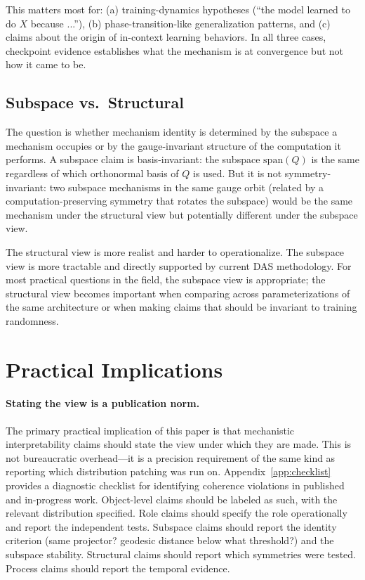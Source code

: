 \documentclass[11pt]{article}
\theoremstyle{remark}
\begin{document}
This matters most for: (a) training-dynamics hypotheses (``the model
learned to do $X$ because ...''), (b) phase-transition-like generalization
patterns, and (c) claims about the origin of in-context learning
behaviors.  In all three cases, checkpoint evidence establishes what
the mechanism is at convergence but not how it came to be.

\subsection{Subspace vs.\ Structural}

The question is whether mechanism identity is determined by the subspace
a mechanism occupies or by the gauge-invariant structure of the
computation it performs.  A subspace claim is basis-invariant: the
subspace $\mathrm{span}(Q)$ is the same regardless of which orthonormal
basis of $Q$ is used.  But it is not symmetry-invariant: two subspace
mechanisms in the same gauge orbit (related by a computation-preserving
symmetry that rotates the subspace) would be the same mechanism under
the structural view but potentially different under the subspace view.

The structural view is more realist and harder to operationalize.  The
subspace view is more tractable and directly supported by current DAS
methodology.  For most practical questions in the field, the subspace
view is appropriate; the structural view becomes important when
comparing across parameterizations of the same architecture or when
making claims that should be invariant to training randomness.


\section{Practical Implications}\label{sec:implications}

\paragraph{Stating the view is a publication norm.}
The primary practical implication of this paper is that mechanistic
interpretability claims should state the view under which they are made.
This is not bureaucratic overhead---it is a precision requirement of
the same kind as reporting which distribution patching was run on.
Appendix~\ref{app:checklist} provides a diagnostic checklist for
identifying coherence violations in published and in-progress work.
Object-level claims should be labeled as such, with the relevant
distribution specified.  Role claims should specify the role operationally
and report the independent tests.  Subspace claims should report the
identity criterion (same projector? geodesic distance below what
threshold?) and the subspace stability.  Structural claims should report
which symmetries were tested.  Process claims should report the
temporal evidence.
\end{document}
